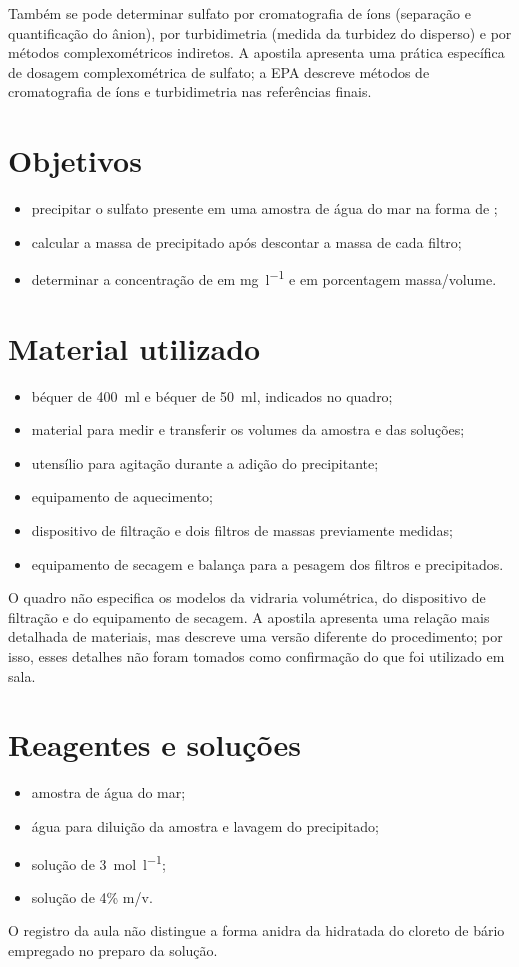 \documentclass[a4paper,12pt]{article}
\begin{document}
Também se pode determinar sulfato por cromatografia de íons (separação e
quantificação do ânion), por turbidimetria (medida da turbidez do
 disperso) e por métodos complexométricos indiretos. A apostila
apresenta uma prática específica de dosagem complexométrica de sulfato;
a EPA descreve métodos de cromatografia de íons e turbidimetria nas
referências finais.

\section{Objetivos}
\begin{itemize}
  \item precipitar o sulfato presente em uma amostra de água do mar na forma de
        ;
  \item calcular a massa de precipitado após descontar a massa de cada filtro;
  \item determinar a concentração de  em
        \si{\milli\gram\per\litre} e em porcentagem massa/volume.
\end{itemize}

\section{Material utilizado}
\begin{itemize}
  \item béquer de \SI{400}{\milli\litre} e béquer de
        \SI{50}{\milli\litre}, indicados no quadro;
  \item material para medir e transferir os volumes da amostra e das soluções;
  \item utensílio para agitação durante a adição do precipitante;
  \item equipamento de aquecimento;
  \item dispositivo de filtração e dois filtros de massas previamente medidas;
  \item equipamento de secagem e balança para a pesagem dos filtros e
        precipitados.
\end{itemize}
O quadro não especifica os modelos da vidraria volumétrica, do dispositivo
de filtração e do equipamento de secagem. A apostila apresenta uma relação
mais detalhada de materiais, mas descreve uma versão diferente do
procedimento; por isso, esses detalhes não foram tomados como confirmação
do que foi utilizado em sala.

\section{Reagentes e soluções}
\begin{itemize}
  \item amostra de água do mar;
  \item água para diluição da amostra e lavagem do precipitado;
  \item solução de  \SI{3}{\mole\per\litre};
  \item solução de  4\% m/v.
\end{itemize}
O registro da aula não distingue a forma anidra da hidratada do cloreto de
bário empregado no preparo da solução.
\end{document}
